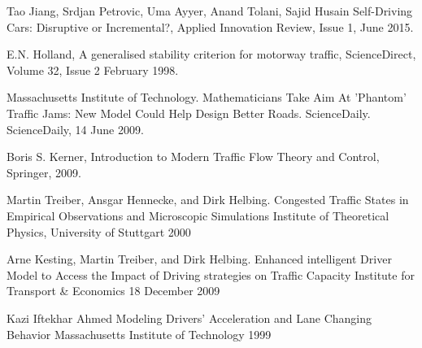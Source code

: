 \begin{thebibliography}{9}

	Tao Jiang, Srdjan Petrovic, Uma Ayyer, Anand Tolani, Sajid Husain
	Self-Driving Cars: Disruptive or Incremental?,
	Applied Innovation Review,
	Issue 1,
	June 2015.

	E.N. Holland,
	A generalised stability criterion for motorway traffic,
	ScienceDirect,
	Volume 32,
	Issue 2
	February 1998.

	Massachusetts Institute of Technology. 
	Mathematicians Take Aim At 'Phantom' Traffic Jams: New Model Could Help Design Better Roads.
	ScienceDaily. 
	ScienceDaily,
	14 June 2009.

	Boris S. Kerner,
	Introduction to Modern Traffic Flow Theory and Control,
	Springer,
	2009.

	Martin Treiber, Ansgar Hennecke, and Dirk Helbing.
	Congested Traffic States in Empirical Observations and Microscopic Simulations
	Institute of Theoretical Physics, University of Stuttgart
	2000

	Arne Kesting, Martin Treiber, and Dirk Helbing.
	Enhanced intelligent Driver Model to Access the Impact of Driving strategies on Traffic Capacity
	Institute for Transport \& Economics
	18 December 2009

	Kazi Iftekhar Ahmed
	Modeling Drivers' Acceleration and Lane Changing Behavior
	Massachusetts Institute of Technology 
	1999

\end{thebibliography}
